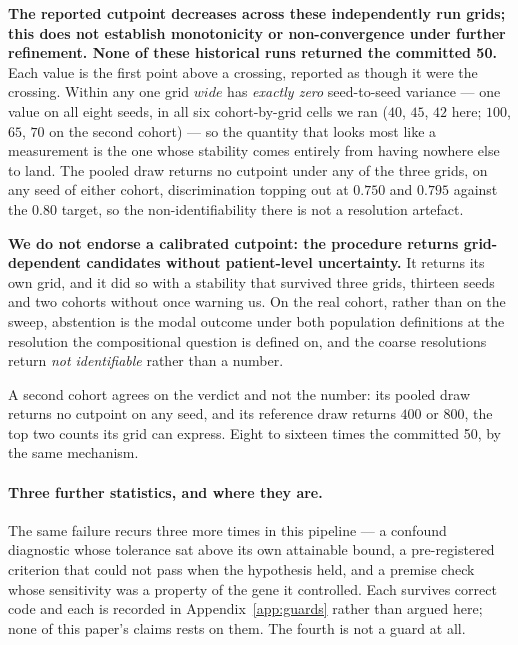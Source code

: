 \textbf{The reported cutpoint decreases across these independently run grids;
this does not establish monotonicity or non-convergence under further
refinement. None of these historical runs returned the committed 50.} Each value is the first point above a crossing, reported as
though it were the crossing. Within any one grid $wide$ has \emph{exactly zero}
seed-to-seed variance --- one value on all eight seeds, in all six
cohort-by-grid cells we ran ($40$, $45$, $42$ here; $100$, $65$, $70$ on the
second cohort) --- so the quantity that looks most like a measurement is the one
whose stability comes entirely from having nowhere else to land. The pooled draw
returns no cutpoint under any of the three grids, on any seed of either cohort,
discrimination topping out at $0.750$ and $0.795$ against the $0.80$ target, so
the non-identifiability there is not a resolution artefact.

\textbf{We do not endorse a calibrated cutpoint: the procedure returns
grid-dependent candidates without patient-level uncertainty.} It returns its own grid, and it did so with a stability that
survived three grids, thirteen seeds and two cohorts without once warning us.
On the real cohort, rather than on the sweep, abstention is the modal outcome
under both population definitions at the resolution the compositional question
is defined on, and the coarse resolutions return \emph{not identifiable}
rather than a number.
\fi

\iffull
A second cohort agrees on the verdict and not the number: its pooled draw
returns no cutpoint on any seed, and its reference draw returns $400$ or
$800$, the top two counts its grid can express. Eight to sixteen times the
committed 50, by the same mechanism.

\paragraph{Three further statistics, and where they are.} The same failure
recurs three more times in this pipeline --- a confound diagnostic whose
tolerance sat above its own attainable bound, a pre-registered criterion that
could not pass when the hypothesis held, and a premise check whose sensitivity
was a property of the gene it controlled. Each survives correct code and each
is recorded in Appendix~\ref{app:guards} rather than argued here; none of this
paper's claims rests on them. The fourth is not a guard at all.


\fi
